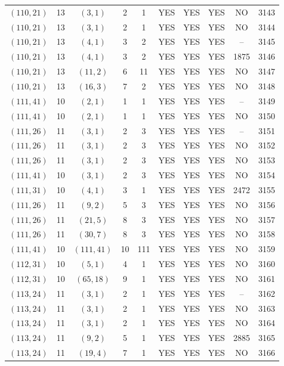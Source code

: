 \begin{longtable}{|c|c|c|c|c|c|c|c|c|c|}
$(110, 21)$ & 13 & $(3, 1)$ & 2 & 1 & YES & YES & YES & NO & 3143\\
$(110, 21)$ & 13 & $(3, 1)$ & 2 & 1 & YES & YES & YES & NO & 3144\\
$(110, 21)$ & 13 & $(4, 1)$ & 3 & 2 & YES & YES & YES & -- & 3145\\
$(110, 21)$ & 13 & $(4, 1)$ & 3 & 2 & YES & YES & YES & 1875 & 3146\\
$(110, 21)$ & 13 & $(11, 2)$ & 6 & 11 & YES & YES & YES & NO & 3147\\
$(110, 21)$ & 13 & $(16, 3)$ & 7 & 2 & YES & YES & YES & NO & 3148\\
$(111, 41)$ & 10 & $(2, 1)$ & 1 & 1 & YES & YES & YES & -- & 3149\\
$(111, 41)$ & 10 & $(2, 1)$ & 1 & 1 & YES & YES & YES & NO & 3150\\
$(111, 26)$ & 11 & $(3, 1)$ & 2 & 3 & YES & YES & YES & -- & 3151\\
$(111, 26)$ & 11 & $(3, 1)$ & 2 & 3 & YES & YES & YES & NO & 3152\\
$(111, 26)$ & 11 & $(3, 1)$ & 2 & 3 & YES & YES & YES & NO & 3153\\
$(111, 41)$ & 10 & $(3, 1)$ & 2 & 3 & YES & YES & YES & NO & 3154\\
$(111, 31)$ & 10 & $(4, 1)$ & 3 & 1 & YES & YES & YES & 2472 & 3155\\
$(111, 26)$ & 11 & $(9, 2)$ & 5 & 3 & YES & YES & YES & NO & 3156\\
$(111, 26)$ & 11 & $(21, 5)$ & 8 & 3 & YES & YES & YES & NO & 3157\\
$(111, 26)$ & 11 & $(30, 7)$ & 8 & 3 & YES & YES & YES & NO & 3158\\
$(111, 41)$ & 10 & $(111, 41)$ & 10 & 111 & YES & YES & YES & NO & 3159\\
$(112, 31)$ & 10 & $(5, 1)$ & 4 & 1 & YES & YES & YES & NO & 3160\\
$(112, 31)$ & 10 & $(65, 18)$ & 9 & 1 & YES & YES & YES & NO & 3161\\
$(113, 24)$ & 11 & $(3, 1)$ & 2 & 1 & YES & YES & YES & -- & 3162\\
$(113, 24)$ & 11 & $(3, 1)$ & 2 & 1 & YES & YES & YES & NO & 3163\\
$(113, 24)$ & 11 & $(3, 1)$ & 2 & 1 & YES & YES & YES & NO & 3164\\
$(113, 24)$ & 11 & $(9, 2)$ & 5 & 1 & YES & YES & YES & 2885 & 3165\\
$(113, 24)$ & 11 & $(19, 4)$ & 7 & 1 & YES & YES & YES & NO & 3166\\

\end{longtable}
